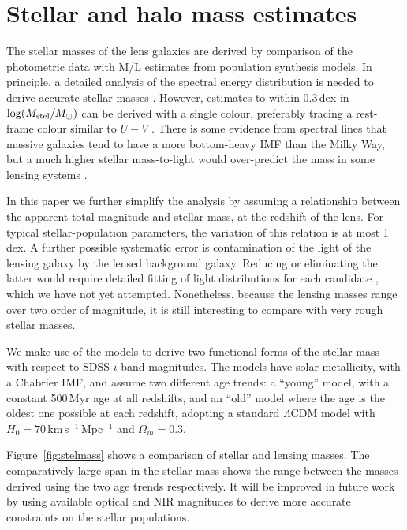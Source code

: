 
\section{Stellar and halo mass estimates}
\label{sec:stellar-mass}

The stellar masses of the lens galaxies are derived by comparison of
the photometric data with M/L estimates from population synthesis
models.  In principle, a detailed analysis of the spectral energy
distribution is needed to derive accurate stellar masses
\citep[e.g.][]{2009ApJS..185..253G,2011MNRAS.418.1587T}.  However,
estimates to within 0.3\,dex in $\log(M_\text{stel}/M_\odot)$ can be derived
with a single colour, preferably tracing a rest-frame colour similar
to $U-V$ \citep[see Fig.~1 of][]{2008MNRAS.383..857F}.  There is some
evidence from spectral lines that massive galaxies tend to have a more
bottom-heavy IMF than the Milky Way, but a much higher stellar
mass-to-light would over-predict the mass in some lensing systems
\citep{2015MNRAS.454L..71S}.

In this paper we further simplify the analysis by assuming a
relationship between the apparent total magnitude and stellar mass, at
the redshift of the lens.  For typical stellar-population parameters,
the variation of this relation is at most 1\,dex.  A further possible
systematic error is contamination of the light of the lensing galaxy
by the lensed background galaxy.  Reducing or eliminating the latter
would require detailed fitting of light distributions for each
candidate \citep[see][]{2011ApJ...740...97L}, which we have not yet
attempted.  Nonetheless, because the lensing masses range over two
order of magnitude, it is still interesting to compare with very rough
stellar masses.

We make use of the \citet{2003MNRAS.344.1000B} models to derive two
functional forms of the stellar mass with respect to SDSS-$i$ band
magnitudes. The models have solar metallicity, with a Chabrier IMF,
and assume two different age trends: a ``young'' model, with a
constant 500\,Myr age at all redshifts, and an ``old'' model where the
age is the oldest one possible at each redshift, adopting a standard
$\Lambda$CDM model with $H_0=70$\,km\,s$^{-1}$\,Mpc$^{-1}$ and
$\Omega_m=0.3$.

Figure~\ref{fig:stelmass} shows a comparison of stellar and lensing
masses.  The comparatively large span in the stellar mass shows the range 
between the masses derived using the two age trends respectively.
It will 
be improved in future work by using available optical and NIR
magnitudes to derive more accurate constraints on the stellar
populations.

